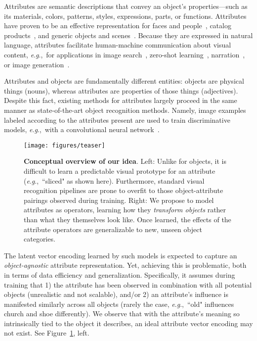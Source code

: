 \documentclass[runningheads]{llncs}
\newcommand{\eg}{\textit{e}.\textit{g}.,~}
\begin{document}
Attributes are semantic descriptions that convey an object's properties---such as its materials, colors, patterns, styles, expressions, parts, or functions.   Attributes have proven to be an effective representation for faces and people~\cite{facetracer,relative-attributes,siddiquie-feris-cvpr2011,walk-learn-cvpr2016,face-attributes-iccv2015,yongjae-stn,lu-feris-cvpr2017}, catalog products~\cite{tamara-eccv2010,whittle-search,yu2017semantic,kimberly-iccv2017}, and generic objects and scenes~\cite{lampert-cvpr2009,farhadi-cvpr2009,Laffont14,sun-attributes-patterson,elhoseiny-cvpr2015,ziad-cvpr2016}.
Because they are expressed in natural language, attributes facilitate human-machine communication about visual content,  \eg for applications in image search~\cite{facetracer,whittle-search}, zero-shot learning~\cite{ziad-cvpr2016}, narration~\cite{baby-talk}, or image generation~\cite{yan2016attribute2image}.

Attributes and objects are fundamentally different entities: objects are physical things (nouns), whereas attributes are properties of those things (adjectives). Despite this fact, existing methods for attributes largely proceed in the same manner as state-of-the-art object recognition methods.  Namely, image examples labeled according to the attributes present are used to train discriminative models, \eg with a convolutional neural network~\cite{walk-learn-cvpr2016,face-attributes-iccv2015,yongjae-stn,lu-feris-cvpr2017,yu2017semantic,su-eccv2016}. 


\begin{figure}[t!]
\centering
\texttt{[image: figures/teaser]}
\vspace{-0.2in}
\caption{ \textbf{Conceptual overview of our idea}. Left: 
Unlike for objects, it is difficult to learn a predictable visual prototype for an attribute (\eg ``sliced" as shown here).  Furthermore, standard visual recognition pipelines are prone to overfit to those object-attribute pairings observed during training.
Right: We propose to model attributes as operators, learning how they \emph{transform objects} rather than what they themselves look like. Once learned, the effects of the attribute operators are generalizable to new, unseen object categories.}
\label{fig:teaser}
\vspace{-0.2in}
\end{figure}

The latent vector encoding learned by such models is expected to capture an \emph{object-agnostic} attribute representation. Yet, achieving this is problematic, both in terms of data efficiency and generalization. Specifically, it assumes during training that 1) the attribute has been observed in combination with all potential objects (unrealistic and not scalable), and/or 2) an attribute's influence is manifested similarly across all objects (rarely the case, \eg ``old" influences church and shoe differently). We observe that with the attribute's meaning so intrinsically tied to the object it describes, an ideal attribute vector encoding may not exist.  See Figure~\ref{fig:teaser}, left.
\end{document}
